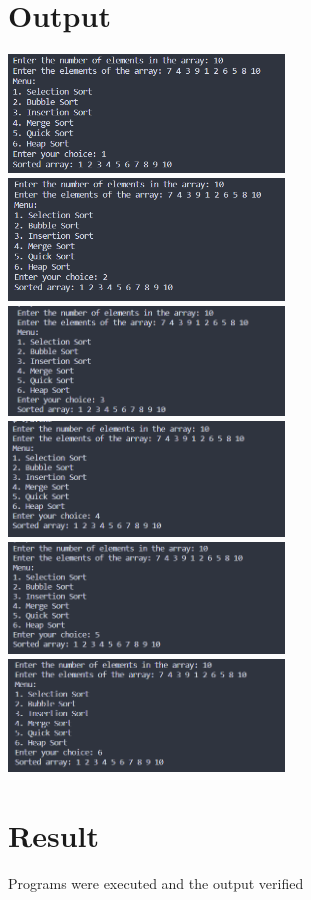 \section{Output}
\includegraphics[width=0.55\textwidth]{Cycle_2/Outputs/Sort1.png}
\includegraphics[width=0.55\textwidth]{Cycle_2/Outputs/Sort2.png}
\includegraphics[width=0.55\textwidth]{Cycle_2/Outputs/Sort3.png}
\includegraphics[width=0.55\textwidth]{Cycle_2/Outputs/Sort4.png}
\includegraphics[width=0.55\textwidth]{Cycle_2/Outputs/Sort5.png}
\includegraphics[width=0.55\textwidth]{Cycle_2/Outputs/Sort6.png}

\section{Result}
Programs were executed and the output verified